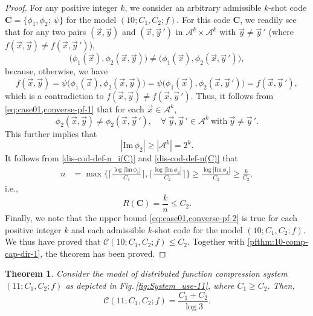 \documentclass[11pt,draftclsnofoot,onecolumn]{IEEEtran}
\newtheorem{theorem}{Theorem}
\newcommand{\mbC}{\mathbf{C}}
\def\Im{\mathrm{Im}}
\begin{document}
\begin{proof}
For any positive integer $k$, we
consider an arbitrary admissible $k$-shot code  $\mbC=\big\{\phi_{1},\phi_{2};~\psi\big\}$ for the model $(10;C_1,C_2;f)$. For this code $\mbC$,
we readily see that
for any two pairs $(\vec{x},\vec{y})$ and $(\vec{x},\vec{y}\,')$ in $\mathcal{A}^k\times\mathcal{A}^k$ with $\vec{y}\neq\vec{y}\,'$ (where $f(\vec{x},\vec{y})\neq f(\vec{x},\vec{y}\,')$),
\begin{equation}
\big(\phi_{1}(\vec{x}),\phi_{2}(\vec{x},\vec{y})\big)\neq
\big(\phi_{1}(\vec{x}),\phi_{2}(\vec{x},\vec{y}\,')\big),
\label{eq:case01,converse-pf-1}
\end{equation}
because, otherwise, we have
\begin{equation*}
f(\vec{x},\vec{y})=\psi\big(\phi_{1}(\vec{x}),\phi_{2}(\vec{x},\vec{y})\big)=\psi
\big(\phi_{1}(\vec{x}),\phi_{2}(\vec{x},\vec{y}\,')\big)=f(\vec{x},\vec{y}\,'),
\end{equation*}
which is a contradiction to $f(\vec{x},\vec{y})\neq f(\vec{x},\vec{y}\,')$. Thus, it follows from \eqref{eq:case01,converse-pf-1} that for each $\vec{x}\in\mathcal{A}^k$,
\begin{equation*}
\phi_{2}(\vec{x},\vec{y})\neq \phi_{2}(\vec{x},\vec{y}\,'),\quad\forall~\vec{y},\vec{y}\,'\in\mathcal{A}^k
~\text{with}~\vec{y}\neq\vec{y}\,'.
\end{equation*}
This further implies that
\begin{equation*}
|\Im\,\phi_{2}|\geq|\mathcal{A}^k|=2^k.
\end{equation*}
It follows from  \eqref{dis-cod-def-n_i(C)} and \eqref{dis-cod-def-n(C)} that
  \begin{align}
n&=\max\bigg\{\bigg\lceil\frac{\log|\Im\,\phi_{1}|}{C_1}\bigg\rceil,\bigg\lceil\frac{\log|\Im\,\phi_{2}|}{C_2}
\bigg\rceil\bigg\}\geq \frac{\log|\Im\,\phi_{2}|}{C_2}\geq \frac{k}{C_2},\nonumber
\end{align}
i.e.,
\begin{equation}
R(\mbC)=\frac{k}{n}\leq C_2.\label{eq:case01,converse-pf-2}
\end{equation}
Finally, we note that the upper bound \eqref{eq:case01,converse-pf-2} is true for each positive integer $k$ and each admissible $k$-shot code for the model $(10;C_1,C_2;f)$. We thus have proved that
  $\mathcal{C}(10;C_1,C_2;f)\leq C_2$.
  Together with \eqref{pfthm:10-comp-cap-dir-1}, the theorem has been proved.
\end{proof}

  \begin{theorem}\label{thm:11-comp-cap}
  Consider the model of distributed function compression system $(11;C_{1}, C_{2};  f)$ as depicted in Fig.\,\ref{fig:System_use-11}, where $C_1\geq C_2$. Then,
\begin{equation*}
\mathcal{C}(11;C_1,C_2;f)=\frac{C_1+C_2}{\log3}.
\end{equation*}
\end{theorem}
\end{document}
